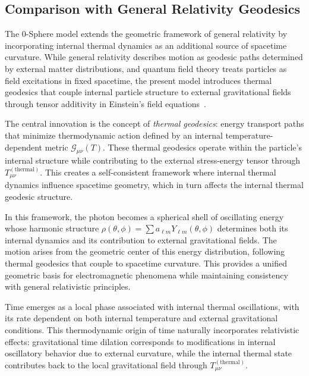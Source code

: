 \documentclass[%
 reprint,
 amsmath,amssymb,
 aps,
]{revtex4-1}
\numberwithin{equation}{section}%
\begin{document}
\subsection{Comparison with General Relativity Geodesics}
\label{subsec:comparison_gr_geodesics}

The 0-Sphere model extends the geometric framework of general relativity by incorporating internal thermal dynamics as an additional source of spacetime curvature. While general relativity describes motion as geodesic paths determined by external matter distributions, and quantum field theory treats particles as field excitations in fixed spacetime, the present model introduces thermal geodesics that couple internal particle structure to external gravitational fields through tensor additivity in Einstein's field equations~\cite{wald1984}.

The central innovation is the concept of \textit{thermal geodesics}: energy transport paths that minimize thermodynamic action defined by an internal temperature-dependent metric $\mathcal{G}_{\mu\nu}(T)$. These thermal geodesics operate within the particle's internal structure while contributing to the external stress-energy tensor through $T_{\mu\nu}^{(\text{thermal})}$. This creates a self-consistent framework where internal thermal dynamics influence spacetime geometry, which in turn affects the internal thermal geodesic structure.

In this framework, the photon becomes a spherical shell of oscillating energy whose harmonic structure $\rho(\theta,\phi) = \sum a_{\ell m} Y_{\ell m}(\theta,\phi)$ determines both its internal dynamics and its contribution to external gravitational fields. The motion arises from the geometric center of this energy distribution, following thermal geodesics that couple to spacetime curvature. This provides a unified geometric basis for electromagnetic phenomena while maintaining consistency with general relativistic principles.

Time emerges as a local phase associated with internal thermal oscillations, with its rate dependent on both internal temperature and external gravitational conditions. This thermodynamic origin of time naturally incorporates relativistic effects: gravitational time dilation corresponds to modifications in internal oscillatory behavior due to external curvature, while the internal thermal state contributes back to the local gravitational field through $T_{\mu\nu}^{(\text{thermal})}$.
\end{document}

